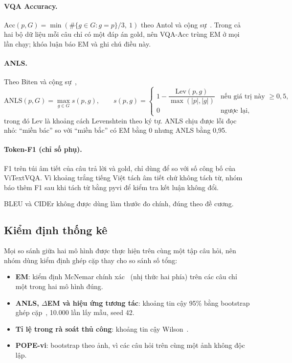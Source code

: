 \paragraph{VQA Accuracy.}
$\mathrm{Acc}(p, G) = \min\left(\#\{g \in G : g = p\}/3,\ 1\right)$ theo Antol và
cộng sự~\cite{antol2015vqa}. Trong cả hai bộ dữ liệu mỗi câu chỉ có một đáp án
gold, nên VQA-Acc trùng EM ở mọi lần chạy; khóa luận báo EM và ghi chú điều này.

\paragraph{ANLS.} Theo Biten và cộng sự~\cite{biten2019stvqa},
\begin{equation}
\mathrm{ANLS}(p, G) = \max_{g \in G} s(p, g), \qquad
s(p, g) =
\begin{cases}
1 - \dfrac{\mathrm{Lev}(p, g)}{\max(|p|, |g|)} & \text{nếu giá trị này } \geq 0{,}5,\\[6pt]
0 & \text{ngược lại,}
\end{cases}
\label{eq:anls}
\end{equation}
trong đó $\mathrm{Lev}$ là khoảng cách Levenshtein theo ký tự. ANLS chịu được lỗi
đọc nhỏ: ``miền bác'' so với ``miền bắc'' có EM bằng 0 nhưng ANLS bằng 0,95.

\paragraph{Token-F1 (chỉ số phụ).} F1 trên túi âm tiết của câu trả lời và gold,
chỉ dùng để so với số công bố của ViTextVQA. Vì khoảng trắng tiếng Việt tách âm
tiết chứ không tách từ, nhóm báo thêm F1 sau khi tách từ bằng pyvi để kiểm tra
kết luận không đổi.

BLEU và CIDEr không được dùng làm thước đo chính, đúng theo đề cương.

\subsection{Kiểm định thống kê}
\label{sec:met-stats}

Mọi so sánh giữa hai mô hình được thực hiện trên cùng một tập câu hỏi, nên nhóm
dùng kiểm định ghép cặp thay cho so sánh số tổng:

\begin{itemize}
  \item \textbf{EM}: kiểm định McNemar chính xác~\cite{mcnemar1947} (nhị thức
  hai phía) trên các câu chỉ một trong hai mô hình đúng.
  \item \textbf{ANLS, $\Delta$EM và hiệu ứng tương tác}: khoảng tin cậy 95\%
  bằng bootstrap ghép cặp~\cite{efron1993}, 10.000 lần lấy mẫu, seed 42.
  \item \textbf{Tỉ lệ trong rà soát thủ công}: khoảng tin cậy Wilson~\cite{wilson1927}.
  \item \textbf{POPE-vi}: bootstrap theo ảnh, vì các câu hỏi trên cùng một ảnh
  không độc lập.
\end{itemize}

